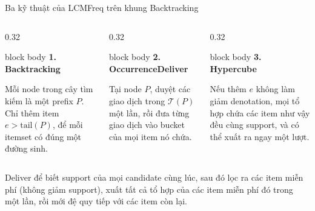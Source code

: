 \documentclass[9pt, aspectratio=169]{beamer}
\newenvironment{quietblock}[1]{%
  \begin{beamercolorbox}[wd=\linewidth,sep=5pt,rounded=true]{block body}
  {\color{psdearblue}\bfseries #1}\par\vspace{2pt}\footnotesize
}{%
  \end{beamercolorbox}
}
\begin{document}
\begin{frame}{Ba kỹ thuật của LCMFreq trên khung Backtracking}
  \begin{columns}[T,onlytextwidth]
    \begin{column}{0.32\textwidth}
      \begin{quietblock}{1. Backtracking}
        Mỗi node trong cây tìm kiếm là một prefix $P$. Chỉ thêm item
        $e>\mathrm{tail}(P)$, để mỗi itemset có đúng một đường sinh.
      \end{quietblock}
    \end{column}
    \begin{column}{0.32\textwidth}
      \begin{quietblock}{2. OccurrenceDeliver}
        Tại node $P$, duyệt các giao dịch trong $\mathcal T(P)$ một lần,
        rồi đưa từng giao dịch vào bucket của mọi item nó chứa.
      \end{quietblock}
    \end{column}
    \begin{column}{0.32\textwidth}
      \begin{quietblock}{3. Hypercube}
        Nếu thêm $e$ không làm giảm denotation, mọi tổ hợp chứa các item
        như vậy đều cùng support, và có thể xuất ra ngay một lượt.
      \end{quietblock}
    \end{column}
  \end{columns}

  \vspace{0.45cm}
  \centering

  \vspace{0.15cm}
  {\scriptsize\color{psdeargray}\centering Deliver để biết support của mọi
  candidate cùng lúc, sau đó lọc ra các item miễn phí (không giảm support),
  xuất tất cả tổ hợp của các item miễn phí đó trong một lần, rồi mới đệ quy
  tiếp với các item còn lại.\par}
\end{frame}
\end{document}
